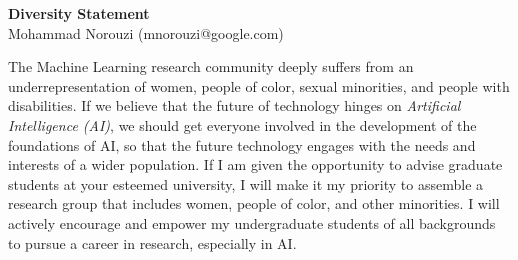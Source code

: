 \documentclass[11pt]{article}
\begin{document}
\thispagestyle{fancy}
\lhead{}
\rhead{}
\renewcommand{\headrulewidth}{0pt} 
\renewcommand{\footrulewidth}{0pt} 


\pagestyle{fancy}
\lhead{\textcolor{gray}{\it Mohammad Norouzi}}
\rhead{\textcolor{gray}{\thepage/\totalpages{}}}


\begin{center}
{\LARGE \bf Diversity Statement}\\
\vspace*{0.1cm}
{\normalsize Mohammad Norouzi (mnorouzi@google.com)}
\vspace*{0.2cm}
\end{center}



The Machine Learning research community deeply suffers from an
underrepresentation of women, people of color, sexual minorities, and
people with disabilities. If we believe that the future of technology
hinges on {\em Artificial Intelligence (AI)}, we should get everyone
involved in the development of the foundations of AI, so that the
future technology engages with the needs and interests of a wider
population. If I am given the opportunity to advise graduate students
at your esteemed university, I will make it my priority to assemble a
research group that includes women, people of color, and other
minorities. I will actively encourage and empower my undergraduate
students of all backgrounds to pursue a career in research, especially
in AI.
\end{document}
